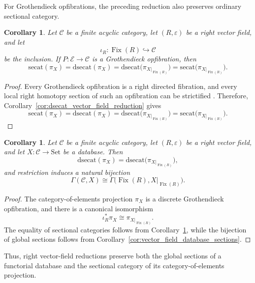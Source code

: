 \documentclass[12pt]{amsart}
\newtheorem{corollary}[teo]{Corollary}
\theoremstyle{definition}
\theoremstyle{remark}
\numberwithin{figure}{section}%
\newcommand{\CC}{\mathcal{C}}
\newcommand{\E}{\mathcal{E}}
\newcommand{\Sets}{\mathrm{Set}}
\begin{document}
For Grothendieck opfibrations, the preceding reduction also preserves
ordinary sectional category.

\begin{corollary}\label{cor:secat_opfibration_vector_field}
Let \(\CC\) be a finite acyclic category, let
\((R,\varepsilon)\) be a right vector field, and let
\[
\iota_R\colon\operatorname{Fix}(R)\hookrightarrow\CC
\]
be the inclusion. If \(P\colon\E\to\CC\) is a Grothendieck opfibration,
then
\[
\mathrm{secat}(\pi_X)
=
\mathrm{dsecat}(\pi_X)
=
\mathrm{dsecat}
\bigl(\pi_{X|_{\operatorname{Fix}(R)}}\bigr)
=
\mathrm{secat}
\bigl(\pi_{X|_{\operatorname{Fix}(R)}}\bigr).
\]
\end{corollary}

\begin{proof}
Every Grothendieck opfibration is a right directed fibration, and every
local right homotopy section of such an opfibration can be strictified
\cite[Propositions~2.6 and~6.4]{DirectedHomotopyDatabases}. Therefore,
Corollary~\ref{cor:dsecat_vector_field_reduction} gives
\[
\mathrm{secat}(\pi_X)
=
\mathrm{dsecat}(\pi_X)
=
\mathrm{dsecat}
\bigl(\pi_{X|_{\operatorname{Fix}(R)}}\bigr)
=
\mathrm{secat}
\bigl(\pi_{X|_{\operatorname{Fix}(R)}}\bigr).
\]
\end{proof}

\begin{corollary}\label{cor:database_vector_field_reduction}
Let \(\CC\) be a finite acyclic category, let
\((R,\varepsilon)\) be a right vector field, and let
\(X\colon\CC\to\Sets\) be a database. Then
\[
\mathrm{dsecat}(\pi_X)
=
\mathrm{dsecat}
\bigl(\pi_{X|_{\operatorname{Fix}(R)}}\bigr),
\]
and restriction induces a natural bijection
\[
\Gamma(\CC,X)
\cong
\Gamma\bigl(
\operatorname{Fix}(R),
X|_{\operatorname{Fix}(R)}
\bigr).
\]
\end{corollary}
\begin{proof}
The category-of-elements projection \(\pi_X\) is a discrete
Grothendieck opfibration, and there is a canonical isomorphism
\[
\iota_R^*\pi_X
\cong
\pi_{X|_{\operatorname{Fix}(R)}}.
\]
The equality of sectional categories follows from
Corollary~\ref{cor:secat_opfibration_vector_field}, while the bijection
of global sections follows from
Corollary~\ref{cor:vector_field_database_sections}.
\end{proof}

Thus, right vector-field reductions preserve both the global sections of
a functorial database and the sectional category of its
category-of-elements projection.
\end{document}
